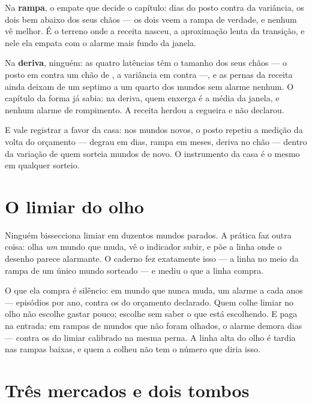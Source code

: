 Na \textbf{rampa}, o empate que decide o capítulo: \numAlertaPostoRampaDias{} dias do posto
contra \numAlertaVarianciaRampaDias{} da variância, os dois bem abaixo dos seus chãos --- os
dois veem a rampa de verdade, e nenhum vê melhor. É o terreno onde a receita nasceu, a
aproximação lenta da transição, e nele ela empata com o alarme mais fundo da janela.

Na \textbf{deriva}, ninguém: as quatro latências têm o tamanho dos seus chãos --- o posto em
\numAlertaPostoDerivaDias{} contra um chão de \numAlertaPostoChaoDias{}, a variância em
\numAlertaVarianciaDerivaDias{} contra \numAlertaVarianciaChaoDias{} ---, e as pernas da
receita ainda deixam de um septimo a um quarto dos mundos sem alarme nenhum. O capítulo da
forma já sabia: na deriva, quem enxerga é a média da janela, e nenhum alarme de rompimento.
A receita herdou a cegueira e não declarou.

E vale registrar a favor da casa: nos mundos novos, o posto repetiu a medição da volta do
orçamento --- degrau em dias, rampa em meses, deriva no chão --- dentro da variação de quem
sorteia mundos de novo. O instrumento da casa é o mesmo em qualquer sorteio.

\section{O limiar do olho}

Ninguém bissecciona limiar em duzentos mundos parados. A prática faz outra coisa: olha
\emph{um} mundo que muda, vê o indicador subir, e põe a linha onde o desenho parece alarmante.
O caderno fez exatamente isso --- a linha no meio da rampa de um único mundo sorteado --- e
mediu o que a linha compra.

O que ela compra é silêncio: em mundo que nunca muda, um alarme a cada
\numAlertaOlhoAnosPorAlarme{} anos --- \numAlertaOlhoEpisodiosAno{} episódios por ano, contra
os \numAlertaPostoEpisodiosAno{} do orçamento declarado. Quem colhe limiar no olho não escolhe
gastar pouco; escolhe sem saber o que está escolhendo. E paga na entrada: em rampas de mundos
que não foram olhados, o alarme demora \numAlertaOlhoRampaDias{} dias --- contra os
\numAlertaVarianciaRampaDias{} do limiar calibrado na mesma perna. A linha alta do olho é
tardia nas rampas baixas, e quem a colheu não tem o número que diria isso.

\section{Três mercados e dois tombos}

